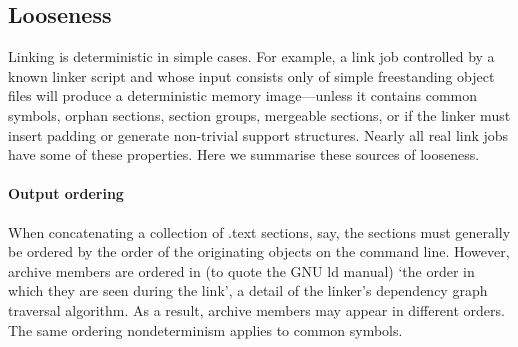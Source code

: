 \documentclass[preprint,10pt]{sigplanconf-pldi16}
\begin{document}
\subsection{Looseness}
\label{sec:looseness}

Linking is deterministic in simple cases.
For example, a link job controlled by a known linker script
and whose input consists only of simple freestanding object files
will produce a deterministic memory image---unless it contains common symbols, 
orphan sections, section groups, mergeable sections, 
or if the linker must insert padding
or generate non-trivial support structures.
Nearly all real link jobs have some of these properties.
Here we summarise these sources of looseness.

\paragraph{Output ordering}
When concatenating a collection of \textsf{.text} sections, say, 
the sections must generally be ordered by the order of the originating objects on the command line.
However, archive members are ordered in (to quote the GNU \textsf{ld} manual) `the order in which they are seen during the link', 
a detail of the linker's dependency graph traversal algorithm.
As a result, archive members may appear in different orders.
The same ordering nondeterminism applies to common symbols.
\end{document}
